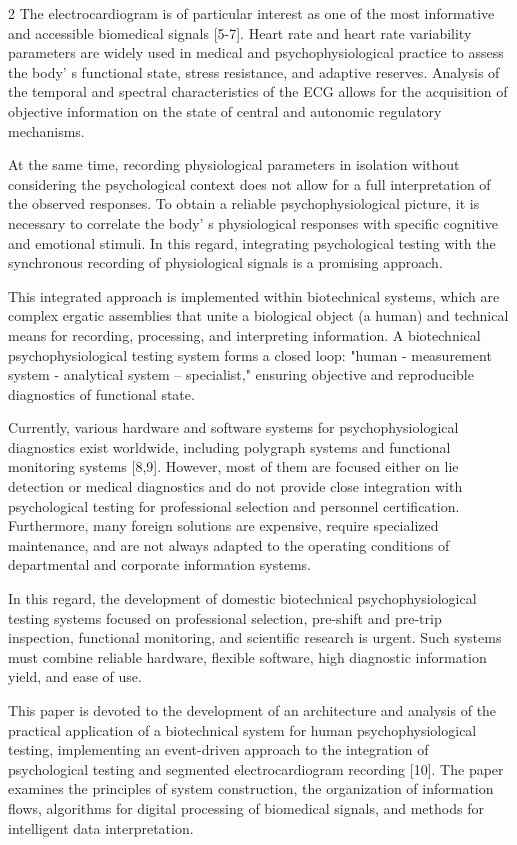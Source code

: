 \begin{multicols}{2}
The electrocardiogram is of particular interest as one of the most
informative and accessible biomedical signals {[}5-7{]}. Heart rate and
heart rate variability parameters are widely used in medical and
psychophysiological practice to assess the body' s
functional state, stress resistance, and adaptive reserves. Analysis of
the temporal and spectral characteristics of the ECG allows for the
acquisition of objective information on the state of central and
autonomic regulatory mechanisms.

At the same time, recording physiological parameters in isolation
without considering the psychological context does not allow for a full
interpretation of the observed responses. To obtain a reliable
psychophysiological picture, it is necessary to correlate the
body' s physiological responses with specific cognitive
and emotional stimuli. In this regard, integrating psychological testing
with the synchronous recording of physiological signals is a promising
approach.

This integrated approach is implemented within biotechnical systems,
which are complex ergatic assemblies that unite a biological object (a
human) and technical means for recording, processing, and interpreting
information. A biotechnical psychophysiological testing system forms a
closed loop: "human - measurement system - analytical system --
specialist," ensuring objective and reproducible diagnostics of
functional state.

Currently, various hardware and software systems for psychophysiological
diagnostics exist worldwide, including polygraph systems and functional
monitoring systems {[}8,9{]}. However, most of them are focused either
on lie detection or medical diagnostics and do not provide close
integration with psychological testing for professional selection and
personnel certification. Furthermore, many foreign solutions are
expensive, require specialized maintenance, and are not always adapted
to the operating conditions of departmental and corporate information
systems.

In this regard, the development of domestic biotechnical
psychophysiological testing systems focused on professional selection,
pre-shift and pre-trip inspection, functional monitoring, and scientific
research is urgent. Such systems must combine reliable hardware,
flexible software, high diagnostic information yield, and ease of use.

This paper is devoted to the development of an architecture and analysis
of the practical application of a biotechnical system for human
psychophysiological testing, implementing an event-driven approach to
the integration of psychological testing and segmented electrocardiogram
recording {[}10{]}. The paper examines the principles of system
construction, the organization of information flows, algorithms for
digital processing of biomedical signals, and methods for intelligent
data interpretation.


\end{multicols}
